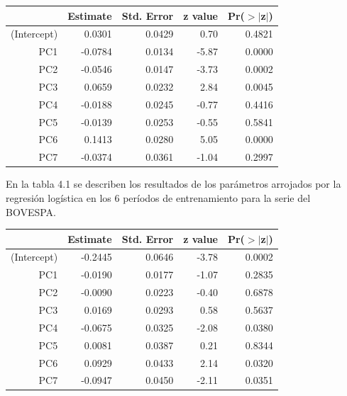 \documentclass[a4paper,12pt]{Latex/Classes/PhDthesisPSnPDF}
\begin{document}
\begin{center}
\begin{table}[ht]
\centering
\begin{tabular}{rrrrr}
  \hline
 & Estimate & Std. Error & z value & Pr($>$$|$z$|$) \\ 
  \hline
(Intercept) & 0.0301 & 0.0429 & 0.70 & 0.4821 \\ 
  PC1 & -0.0784 & 0.0134 & -5.87 & 0.0000 \\ 
  PC2 & -0.0546 & 0.0147 & -3.73 & 0.0002 \\ 
  PC3 & 0.0659 & 0.0232 & 2.84 & 0.0045 \\ 
  PC4 & -0.0188 & 0.0245 & -0.77 & 0.4416 \\ 
  PC5 & -0.0139 & 0.0253 & -0.55 & 0.5841 \\ 
  PC6 & 0.1413 & 0.0280 & 5.05 & 0.0000 \\ 
  PC7 & -0.0374 & 0.0361 & -1.04 & 0.2997 \\ 
   \hline
\end{tabular}
\end{table}\end{center}



En la tabla 4.1 se describen los resultados de los parámetros arrojados por la regresión logística en los 6 períodos de entrenamiento para la serie del BOVESPA.
\begin{center}
\begin{table}[ht]
\centering
\begin{tabular}{rrrrr}
  \hline
 & Estimate & Std. Error & z value & Pr($>$$|$z$|$) \\ 
  \hline
(Intercept) & -0.2445 & 0.0646 & -3.78 & 0.0002 \\ 
  PC1 & -0.0190 & 0.0177 & -1.07 & 0.2835 \\ 
  PC2 & -0.0090 & 0.0223 & -0.40 & 0.6878 \\ 
  PC3 & 0.0169 & 0.0293 & 0.58 & 0.5637 \\ 
  PC4 & -0.0675 & 0.0325 & -2.08 & 0.0380 \\ 
  PC5 & 0.0081 & 0.0387 & 0.21 & 0.8344 \\ 
  PC6 & 0.0929 & 0.0433 & 2.14 & 0.0320 \\ 
  PC7 & -0.0947 & 0.0450 & -2.11 & 0.0351 \\ 
   \hline
\end{tabular}
\end{table}\end{center}
\end{document}
